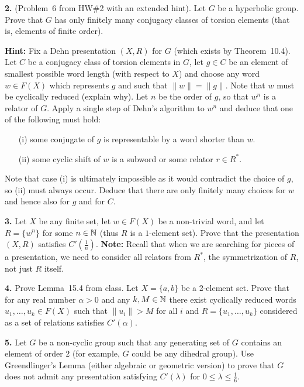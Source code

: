 \documentclass[12pt]{amsart}
\begin{document}
\skv
{\bf 2.} (Problem~6 from HW\#2 with an extended hint). Let $G$ be a hyperbolic group. Prove that $G$ has only finitely many conjugacy classes of torsion elements (that is, elements of finite order).

{\bf Hint:} Fix a Dehn presentation $(X,R)$ for $G$ (which exists by Theorem~10.4). 
Let $C$ be a conjugacy class of torsion elements in $G$, let $g\in C$ be an element of smallest possible word length (with respect to $X$)
and choose any word $w\in F(X)$ which represents $g$ and such that $\|w\|=\|g\|$. Note that $w$ must be cyclically reduced (explain why).
Let $n$ be the order of $g$, so that $w^n$ is a relator of $G$.  Apply a single step of Dehn's algorithm to $w^n$ and deduce
that one of the following must hold:

\begin{itemize}
\item[(i)] some conjugate of $g$ is representable by a word shorter than $w$.
\item[(ii)] some cyclic shift of $w$ is a subword or some relator $r\in R^*$. 
\end{itemize}

Note that case (i) is ultimately impossible as it would contradict the choice of $g$, so (ii) must always occur. Deduce that there are only
finitely many choices for $w$ and hence also for $g$ and for $C$.
\skv

{\bf 3.} Let $X$ be any finite set, let $w\in F(X)$ be a non-trivial word, and let $R=\{w^n\}$ for some $n\in{\mathbb N}$ (thus $R$ is a $1$-element set).
Prove that the presentation $(X,R)$ satisfies $C'(\frac{1}{n})$. {\bf Note:} Recall that when we are searching for pieces of a presentation,
we need to consider all relators from $R^*$, the symmetrization of $R$, not just $R$ itself.
\skv

{\bf 4.} Prove Lemma~15.4 from class. Let $X=\{a,b\}$ be a 2-element set. Prove that for any real number $\alpha>0$ and any $k,M\in{\mathbb N}$ there exist
cyclically reduced words $u_1,\ldots, u_k\in F(X)$ such that $\|u_i\|>M$ for all $i$ and $R=\{u_1,\ldots, u_k\}$ considered as a set of relations satisfies $C'(\alpha)$.
\skv

{\bf 5.} Let $G$ be a non-cyclic group such that any generating set of $G$ contains an element of order $2$ (for example, $G$ could be any dihedral group). Use Greendlinger's Lemma (either algebraic or geometric version) to prove that $G$ does not admit any presentation satisfying $C'(\lambda)$ for $0\leq \lambda\leq \frac{1}{6}$.
\end{document}
